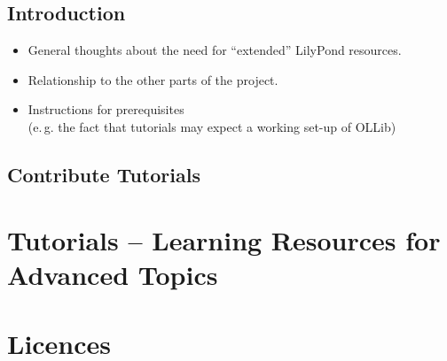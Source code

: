 \documentclass{OLLbook}
\begin{document}
\maketitle

\tableofcontents
\vfill
\pagebreak



\chapter{Introduction}

\begin{itemize}
\item General thoughts about the need for “extended” LilyPond resources.
\item Relationship to the other parts of the project.
\item Instructions for prerequisites\\
(e.\,g. the fact that tutorials may expect a working set-up of OLLib)
\end{itemize}

\chapter{Contribute Tutorials}



\part{Tutorials -- Learning Resources for Advanced Topics}





\part{Licences}

\end{document}
